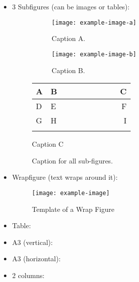 \begin{itemize}
    \item 3 Subfigures (can be images or tables):
    \begin{figure}[tph]
        \centering
        \begin{subfigure}{0.3\textwidth}
        \centering
        \texttt{[image: example-image-a]} %
        \caption{Caption A.}            %
        \label{subfig:subfig-example-a} %
        \end{subfigure}
        \hfill
        \begin{subfigure}{0.3\textwidth}
        \centering
        \texttt{[image: example-image-b]}
        \caption{Caption B.}
        \label{subfig:subfig-example-b}
        \end{subfigure}
        \hfill 
        \begin{subtable}[b]{0.3\textwidth}
            \begin{tabular}{L{0.1\linewidth} C{0.4\linewidth} r}
            \hhline{===} 
            \textbf{A} & \textbf{B} & \textbf{C}   \\ \hline 
            D & E & F   \\
            G & H & I   \\
            \hhline{===}
            \end{tabular}
            \caption{Caption C}
          \label{table:table}
      \end{subtable}
    \caption{Caption for all sub-figures.}  %
    \label{fig:subfig-example}              %
    \end{figure}
    
    \item Wrapfigure (text wraps around it):
    
    \begin{wrapfigure}{r}{0.4\linewidth}
        \centering
        \texttt{[image: example-image]}
        \caption{Template of a Wrap Figure}
        \label{fig:descriptive-label}
    \end{wrapfigure}
    \lipsum[1]
    \item Table:
    \item A3 (vertical):
    \item A3 (horizontal):
    \item 2 columns:
\end{itemize}